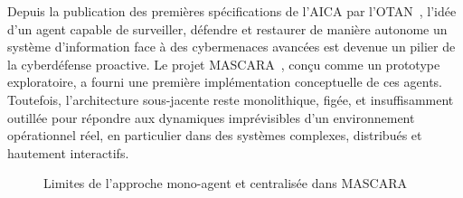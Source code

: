 \documentclass[ twoside,openright,titlepage,numbers=noenddot,headinclude,%
                footinclude=true,cleardoublepage=empty,abstractoff, %
                BCOR=5mm,paper=a4,fontsize=11pt,%
                french,american,%
                ]{scrreprt}
\begin{document}

Depuis la publication des premières spécifications de l'AICA par l'OTAN~\cite{AICAGuide2022}, l'idée d'un agent capable de surveiller, défendre et restaurer de manière autonome un système d'information face à des cybermenaces avancées est devenue un pilier de la cyberdéfense proactive. Le projet MASCARA~\cite{MASCARA2022}, conçu comme un prototype exploratoire, a fourni une première implémentation conceptuelle de ces agents. Toutefois, l'architecture sous-jacente reste monolithique, figée, et insuffisamment outillée pour répondre aux dynamiques imprévisibles d'un environnement opérationnel réel, en particulier dans des systèmes complexes, distribués et hautement interactifs.

\begin{figure}[h]
    \centering
    \caption{Limites de l'approche mono-agent et centralisée dans MASCARA}
    \label{fig:mascara-limit}
\end{figure}
\end{document}
